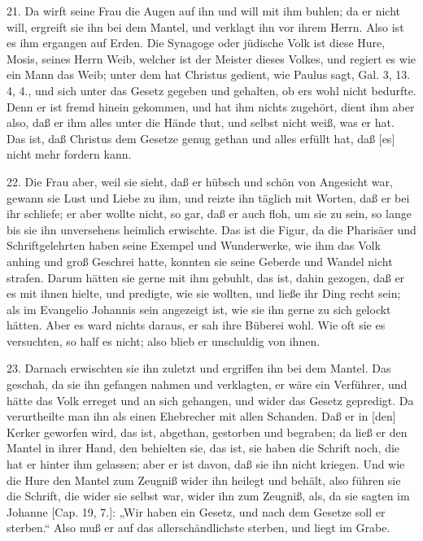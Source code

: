 21. Da wirft seine Frau die Augen auf ihn und will mit ihm buhlen; da er nicht will, ergreift sie ihn bei dem Mantel, und verklagt ihn vor ihrem Herrn. Also ist es ihm ergangen auf Erden. Die Synagoge oder jüdische Volk ist diese Hure, Mosis, seines Herrn Weib, welcher ist der Meister dieses Volkes, und regiert es wie ein Mann das Weib; unter dem hat Christus gedient, wie Paulus sagt, Gal. 3, 13. 4, 4., und sich unter das Gesetz gegeben und gehalten, ob ers wohl nicht bedurfte. Denn er ist fremd hinein gekommen, und hat ihm nichts zugehört, dient ihm aber also, daß er ihm alles unter die Hände thut, und selbst nicht weiß, was er hat. Das ist, daß Christus dem Gesetze genug gethan und alles erfüllt hat, daß [es] nicht mehr fordern kann.

22. Die Frau aber, weil sie sieht, daß er hübsch und schön von Angesicht war, gewann sie Lust und Liebe zu ihm, und reizte ihn täglich mit Worten, daß er bei ihr schliefe; er aber wollte nicht, so gar, daß er auch floh, um sie zu sein, so lange bis sie ihn unversehens heimlich erwischte. Das ist die Figur, da die Pharisäer und Schriftgelehrten haben seine Exempel und Wunderwerke, wie ihm das Volk anhing und groß Geschrei hatte, konnten sie seine Geberde und Wandel nicht strafen. Darum hätten sie gerne mit ihm gebuhlt, das ist, dahin gezogen, daß er es mit ihnen hielte, und predigte, wie sie wollten, und ließe ihr Ding recht sein; als im Evangelio Johannis sein angezeigt ist, wie sie ihn gerne zu sich gelockt hätten. Aber es ward nichts daraus, er sah ihre Büberei wohl. Wie oft sie es versuchten, so half es nicht; also blieb er unschuldig von ihnen.

23. Darnach erwischten sie ihn zuletzt und ergriffen ihn bei dem Mantel. Das geschah, da sie ihn gefangen nahmen und verklagten, er wäre ein Verführer, und hätte das Volk erreget und an sich gehangen, und wider das Gesetz gepredigt. Da verurtheilte man ihn als einen Ehebrecher mit allen Schanden. Daß er in [den] Kerker geworfen wird, das ist, abgethan, gestorben und begraben; da ließ er den Mantel in ihrer Hand, den behielten sie, das ist, sie haben die Schrift noch, die hat er hinter ihm gelassen; aber er ist davon, daß sie ihn nicht kriegen. Und wie die Hure den Mantel zum Zeugniß wider ihn heilegt und behält, also führen sie die Schrift, die wider sie selbst war, wider ihn zum Zeugniß, als, da sie sagten im Johanne [Cap. 19, 7.]: „Wir haben ein Gesetz, und nach dem Gesetze soll er sterben.“ Also muß er auf das allerschändlichste sterben, und liegt im Grabe.

